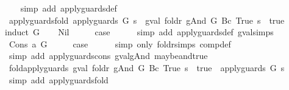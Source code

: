 \begin{isabellebody}
%
\isadelimproof
\ \ %
\endisadelimproof
%
\isatagproof
{}\isamarkupfalse%
\ {\isacharparenleft}simp\ add{\isacharcolon}\ apply{\isacharunderscore}guards{\isacharunderscore}def{\isacharparenright}%
\endisatagproof
{\isafoldproof}%
%
\isadelimproof
\isanewline
%
\endisadelimproof
\isanewline
{}\isamarkupfalse%
\ apply{\isacharunderscore}guards{\isacharunderscore}fold{\isacharcolon}\ {\isachardoublequoteopen}apply{\isacharunderscore}guards\ G\ s\ {\isacharequal}\ {\isacharparenleft}gval\ {\isacharparenleft}foldr\ gAnd\ G\ {\isacharparenleft}Bc\ True{\isacharparenright}{\isacharparenright}\ s\ {\isacharequal}\ true{\isacharparenright}{\isachardoublequoteclose}\isanewline
%
\isadelimproof
%
\endisadelimproof
%
\isatagproof
{}\isamarkupfalse%
{\isacharparenleft}induct\ G{\isacharparenright}\isanewline
\ \ \isamarkupfalse%
\ Nil\isanewline
\ \ \isamarkupfalse%
\ \isamarkupfalse%
\ {\isacharquery}case\isanewline
\ \ \ \ \isamarkupfalse%
\ {\isacharparenleft}simp\ add{\isacharcolon}\ apply{\isacharunderscore}guards{\isacharunderscore}def\ gval{\isachardot}simps{\isacharparenright}\isanewline
{}\isamarkupfalse%
\isanewline
\ \ \isamarkupfalse%
\ {\isacharparenleft}Cons\ a\ G{\isacharparenright}\isanewline
\ \ \isamarkupfalse%
\ \isamarkupfalse%
\ {\isacharquery}case\isanewline
\ \ \ \ \isamarkupfalse%
\ {\isacharparenleft}simp\ only{\isacharcolon}\ foldr{\isachardot}simps\ comp{\isacharunderscore}def{\isacharparenright}\isanewline
\ \ \ \ \isamarkupfalse%
\ {\isacharparenleft}simp\ add{\isacharcolon}\ apply{\isacharunderscore}guards{\isacharunderscore}cons\ gval{\isacharunderscore}gAnd\ maybe{\isacharunderscore}and{\isacharunderscore}true{\isacharparenright}\isanewline
{}\isamarkupfalse%
%
\endisatagproof
{\isafoldproof}%
%
\isadelimproof
\isanewline
%
\endisadelimproof
\isanewline
{}\isamarkupfalse%
\ fold{\isacharunderscore}apply{\isacharunderscore}guards{\isacharcolon}\ {\isachardoublequoteopen}{\isacharparenleft}gval\ {\isacharparenleft}foldr\ gAnd\ G\ {\isacharparenleft}Bc\ True{\isacharparenright}{\isacharparenright}\ s\ {\isacharequal}\ true{\isacharparenright}\ {\isacharequal}\ apply{\isacharunderscore}guards\ G\ s{\isachardoublequoteclose}\isanewline
%
\isadelimproof
\ \ %
\endisadelimproof
%
\isatagproof
{}\isamarkupfalse%
\ {\isacharparenleft}simp\ add{\isacharcolon}\ apply{\isacharunderscore}guards{\isacharunderscore}fold{\isacharparenright}%

\end{isabellebody}
